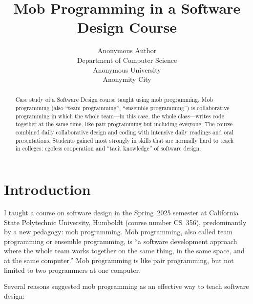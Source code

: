 \documentclass{article}
\title{Mob Programming in a Software Design Course}
\author{
Anonymous Author \\
Department of Computer Science \\
Anonymous University \\
Anonymity City \\
\email{anon@example.com}
}
\begin{document}
\maketitle

\begin{abstract}
Case study of a Software Design course taught using mob programming. Mob
programming (also ``team programming'', ``ensemble programming'') is
collaborative programming in which the whole team---in this case, the
whole class---writes code together at the same time, like pair programming
but including everyone. The course combined daily collaborative design and
coding with intensive daily readings and oral presentations. Students
gained most strongly in skills that are normally hard to teach in
colleges: egoless cooperation and ``tacit knowledge'' of software design.
\end{abstract}

\section{Introduction}
I taught a course on software design in the Spring~2025 semester at
California State Polytechnic University, Humboldt (course number CS~356),
predominantly by a new pedagogy: mob programming. Mob programming,
also called team programming or ensemble programming, is ``a software
development approach where the whole team works together on the same thing,
in the same space, and at the same computer.'' \cite{zuill2022software}
Mob programming is like pair programming, but not limited to two programmers
at one computer.

Several reasons suggested mob programming as an effective way to teach
software design:
\end{document}
